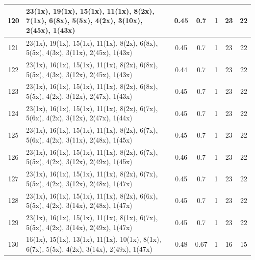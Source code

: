 \begin{small}
\begin{longtable}{|c|p{4cm}|c|c|c|c|c|}
  120 & 23(1x), 19(1x), 15(1x), 11(1x), 8(2x), 7(1x), 6(8x), 5(5x), 4(2x), 3(10x), 2(45x), 1(43x) & \cellcolor{colorGood}  0.45 & \cellcolor{colorGood} 0.7 & 1 & 23 & \cellcolor{colorBad} 22 \\   \hline
  121 & 23(1x), 19(1x), 15(1x), 11(1x), 8(2x), 6(8x), 5(5x), 4(3x), 3(11x), 2(45x), 1(43x) & \cellcolor{colorGood}  0.45 & \cellcolor{colorGood} 0.7 & 1 & 23 & \cellcolor{colorBad} 22 \\   \hline
  122 & 23(1x), 16(1x), 15(1x), 11(1x), 8(2x), 6(8x), 5(5x), 4(3x), 3(12x), 2(45x), 1(43x) & \cellcolor{colorGood}  0.44 & \cellcolor{colorGood} 0.7 & 1 & 23 & \cellcolor{colorBad} 22 \\   \hline
  123 & 23(1x), 16(1x), 15(1x), 11(1x), 8(2x), 6(8x), 5(5x), 4(2x), 3(12x), 2(47x), 1(43x) & \cellcolor{colorGood}  0.45 & \cellcolor{colorGood} 0.7 & 1 & 23 & \cellcolor{colorBad} 22 \\   \hline
  124 & 23(1x), 16(1x), 15(1x), 11(1x), 8(2x), 6(7x), 5(6x), 4(2x), 3(12x), 2(47x), 1(44x) & \cellcolor{colorGood}  0.45 & \cellcolor{colorGood} 0.7 & 1 & 23 & \cellcolor{colorBad} 22 \\   \hline
  125 & 23(1x), 16(1x), 15(1x), 11(1x), 8(2x), 6(7x), 5(6x), 4(2x), 3(11x), 2(48x), 1(45x) & \cellcolor{colorGood}  0.45 & \cellcolor{colorGood} 0.7 & 1 & 23 & \cellcolor{colorBad} 22 \\   \hline
  126 & 23(1x), 16(1x), 15(1x), 11(1x), 8(2x), 6(7x), 5(5x), 4(2x), 3(12x), 2(49x), 1(45x) & \cellcolor{colorGood}  0.46 & \cellcolor{colorGood} 0.7 & 1 & 23 & \cellcolor{colorBad} 22 \\   \hline
  127 & 23(1x), 16(1x), 15(1x), 11(1x), 8(2x), 6(7x), 5(5x), 4(2x), 3(12x), 2(48x), 1(47x) & \cellcolor{colorGood}  0.45 & \cellcolor{colorGood} 0.7 & 1 & 23 & \cellcolor{colorBad} 22 \\   \hline
  128 & 23(1x), 16(1x), 15(1x), 11(1x), 8(2x), 6(6x), 5(5x), 4(2x), 3(14x), 2(48x), 1(47x) & \cellcolor{colorGood}  0.45 & \cellcolor{colorGood} 0.7 & 1 & 23 & \cellcolor{colorBad} 22 \\   \hline
  129 & 23(1x), 16(1x), 15(1x), 11(1x), 8(1x), 6(7x), 5(5x), 4(2x), 3(14x), 2(49x), 1(47x) & \cellcolor{colorGood}  0.45 & \cellcolor{colorGood} 0.7 & 1 & 23 & \cellcolor{colorBad} 22 \\   \hline
  130 & 16(1x), 15(1x), 13(1x), 11(1x), 10(1x), 8(1x), 6(7x), 5(5x), 4(2x), 3(14x), 2(49x), 1(47x) & \cellcolor{colorGood}  0.48 & \cellcolor{colorGood} 0.67 & 1 & 16 & \cellcolor{colorBad} 15 \\   \hline

\end{longtable}
\end{small}

